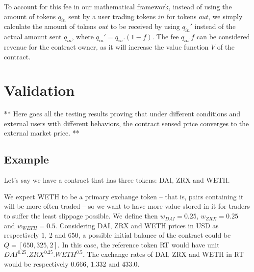 \documentclass[11pt]{amsart}
\begin{document}
To account for this fee in our mathematical framework, instead of using the amount of tokens $q_{in}$ sent by a user trading tokens $in$ for tokens $out$, we simply calculate the amount of tokens $out$ to be received by using $q_{in}'$ instead of the actual amount sent $q_{in}$, where $q_{in}' = q_{in}.(1-f)$. The fee $q_{in}. f$ can be considered revenue for the contract owner, as it will increase the value function $V$ of the contract.

\section{Validation}

** Here goes all the testing results proving that under different conditions and external users with different behaviors, the contract sensed price converges to the external market price. **

\subsection{Example}

Let's say we have a contract that has three tokens: DAI, ZRX and WETH.

We expect WETH to be a primary exchange token -- that is, pairs containing it will be more often traded -- so we want to have more value stored in it for traders to suffer the least slippage possible. We define then $w_{DAI} = 0.25$, $w_{ZRX} = 0.25$ and $w_{WETH} = 0.5$. Considering DAI, ZRX and WETH prices in USD as respectively 1, 2 and 650, a possible initial balance of the contract could be $Q = [650, 325, 2]$. In this case, the reference token RT would have unit $DAI^{0.25}.ZRX^{0.25}.WETH^{0.5}$. The exchange rates of DAI, ZRX and WETH in RT would be respectively 0.666,	1.332 and 433.0.
\end{document}
